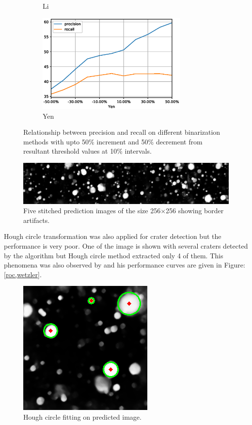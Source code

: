 \documentclass[11pt]{article}
\begin{document}
\begin{figure}[H]
\begin{subfigure}{7cm}
		\caption{Li}
	\end{subfigure}
	\begin{subfigure}[b]{1.0\textwidth}
		\centering
		\includegraphics[width=7.5cm]{files/results/yen.eps}
		\caption{Yen}
	\end{subfigure}

	\caption{Relationship between precision and recall on different binarization methods with upto 50\% increment and 50\% decrement from resultant threshold values at 10\% intervals.}
	\label{thresh_methods}
\end{figure}

\begin{figure}[H]
	\centering
	\includegraphics[width=.8\textwidth]{files/results/hcon_thesis-1.png}
	\caption{Five stitched prediction images of the size 256$\times$256 showing border artifacts.}
	\label{artifacts}
\end{figure}

Hough circle transformation was also applied for crater detection but the performance is very poor. One of the image is shown with several craters detected by the algorithm but Hough circle method extracted only 4 of them. This phenomena was also observed by \cite{wetzler2005learning} and his performance curves are given in Figure: \ref{roc,wetzler}.

\begin{figure}[H]
	\centering
	\includegraphics[width=.4\textwidth]{files/results/hough.png}
	\caption{Hough circle fitting on predicted image.}
	\label{hough}
\end{figure}
\end{document}
